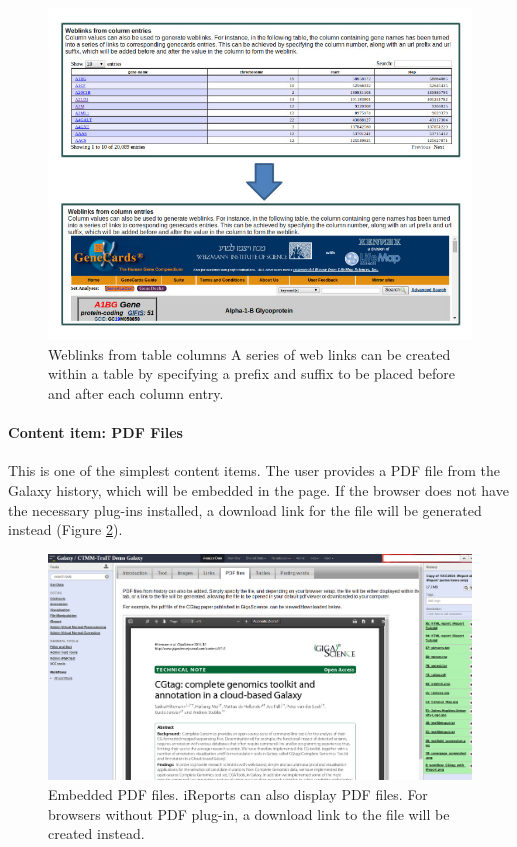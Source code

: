 \begin{figure}[h!]
    \includegraphics[width=\textwidth]{chapters/images/iReport/Hiltemann_columnlinks.jpg}
    \caption{Weblinks from table columns
   A series of web links can be created within a table by specifying a prefix and suffix to be placed before and after each column entry.}
    \label{fig:collinks}
\end{figure}

\paragraph*{Content item: PDF Files}
This is one of the simplest content items. The user provides a PDF file from the Galaxy history, which will be embedded in the page. If the browser does not have the necessary plug-ins installed, a download link for the file will be generated instead (Figure \ref{fig:pdfexample}).

\begin{figure}[h!]
    \includegraphics[width=\textwidth]{chapters/images/iReport/Hiltemann_PDF.jpg}
    \caption{Embedded PDF files. iReports can also display PDF files. For browsers without PDF plug-in, a download link to the file will be created instead. }
    \label{fig:pdfexample}
\end{figure}

